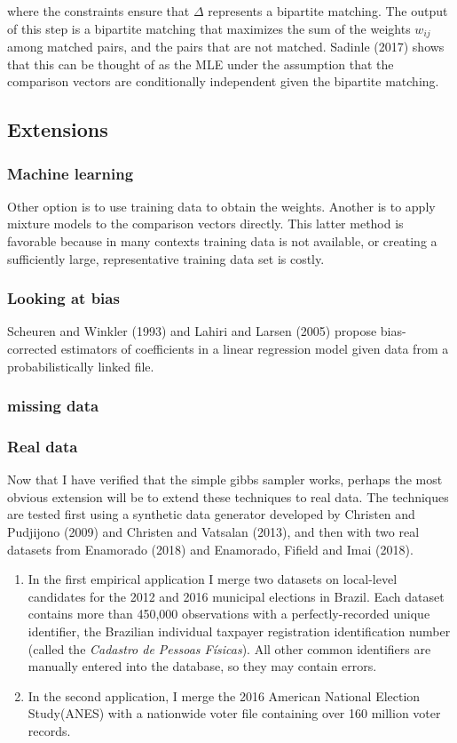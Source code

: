 \documentclass[11pt,reqno]{amsart}
\begin{document}
where the constraints ensure that $\Delta$ represents a bipartite matching.  The output of this step is a bipartite matching that maximizes the sum of the weights $w_{ij}$ among matched pairs, and the pairs that are not matched.  Sadinle (2017) shows that this can be thought of as the MLE under the assumption that the comparison vectors are conditionally independent given the bipartite matching. %


\subsection{Extensions}
\subsubsection{Machine learning} Other option is to use training data to obtain the weights.  Another is to apply mixture models to the comparison vectors directly.  This latter method is favorable because in many contexts training data is not available, or creating a sufficiently large, representative training data set is costly.  
\subsubsection{Looking at bias}
Scheuren and Winkler (1993) and Lahiri and Larsen (2005) propose bias-corrected estimators of coefficients in a linear regression model given data from a probabilistically linked file. 

\subsubsection{missing data}
\subsubsection{Real data} Now that I have verified that the simple gibbs sampler works, perhaps the most obvious extension will be to extend these techniques to real data. 
The techniques are tested first using a synthetic data generator developed by Christen and Pudjijono (2009) and Christen and Vatsalan (2013), and then with two real datasets from Enamorado (2018) and Enamorado, Fifield and Imai (2018). 
\begin{enumerate}
\item In the first empirical application I merge two datasets on local-level candidates for the 2012 and 2016 municipal elections in Brazil.  Each dataset contains more than 450,000 observations with a perfectly-recorded unique identifier, the Brazilian individual taxpayer registration identification number (called the \textit{Cadastro de Pessoas F\'isicas}).  All other common identifiers are manually entered into the database, so they may contain errors.  

\item In the second application, I merge the 2016 American National Election Study(ANES) with a nationwide voter file containing over 160 million voter records.  
\end{enumerate}
\end{document}
